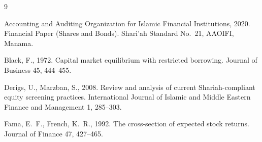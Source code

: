 \documentclass[11pt,letterpaper]{article}
\begin{document}

\begin{thebibliography}{9}

Accounting and Auditing Organization for Islamic Financial Institutions, 2020.
\newblock Financial Paper (Shares and Bonds).
\newblock Shari'ah Standard No.~21, AAOIFI, Manama.

Black, F., 1972.
\newblock Capital market equilibrium with restricted borrowing.
\newblock Journal of Business 45, 444--455.

Derigs, U., Marzban, S., 2008.
\newblock Review and analysis of current Shariah-compliant equity screening practices.
\newblock International Journal of Islamic and Middle Eastern Finance and Management 1, 285--303.

Fama, E.~F., French, K.~R., 1992.
\newblock The cross-section of expected stock returns.
\newblock Journal of Finance 47, 427--465.

\end{thebibliography}
\end{document}
